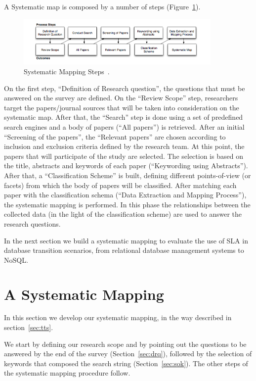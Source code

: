 \documentclass[]{tEIS2e}
\theoremstyle{plain}
\theoremstyle{remark}
\begin{document}
A Systematic map is composed by a number of steps (Figure~\ref{fig:sms}).
\begin{figure}[ht!]
\centering
\includegraphics[width=100mm]{pic1.png}
\caption{Systematic Mapping Steps~\citep{Petersen:2008:SMS:2227115.2227123}.\label{fig:sms}}
\end{figure}

On the first step, ``Definition of Research question'', the questions that must be answered on the survey are defined. 
On the ``Review Scope'' step, researchers target the papers/journal sources that will be taken into consideration on the systematic map. 
After that, the ``Search'' step is done using a set of predefined search engines and a body of papers (``All papers'') is retrieved. 
After an initial ``Screening of the papers'', the ``Relevant papers'' are chosen according to inclusion and exclusion criteria defined by the research team. 
At this point, the papers that will participate of the study are selected. 
The selection is based on the title, abstracts and keywords of each paper (``Keywording using Abstracts'').
After that, a ``Classification Scheme'' is built, defining different points-of-view (or facets) from which the body of papers will be classified. 
After matching each paper with the classification schema (``Data Extraction and Mapping Process''), the  systematic mapping is performed.
In this phase the relationships between the collected data (in the light of the classification scheme) are used to answer the research questions.


In the next section we build a systematic mapping to evaluate the use of SLA in database transition scenarios, from relational database management systems to NoSQL.


\section{A Systematic Mapping}
\label{sec:asm}

In this section we develop our systematic mapping, in the way described in section~\ref{sec:tts}.

We start by defining our research scope and by pointing out the questions to be answered by the end of the survey (Section~\ref{sec:drq}), followed by the selection of keywords that composed the search string (Section~\ref{sec:sok}).
The other steps of the systematic mapping procedure follow.
\end{document}

